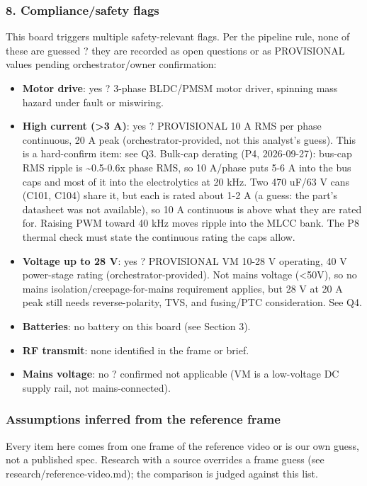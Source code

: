 \documentclass[11pt,a4paper]{article}
\begin{document}
\subsubsection*{8. Compliance/safety flags}
This board triggers multiple safety-relevant flags. Per the pipeline rule, none of these are guessed ? they are recorded as open questions or as PROVISIONAL values pending orchestrator/owner confirmation:

\begin{itemize}
\item \textbf{Motor drive}: yes ? 3-phase BLDC/PMSM motor driver, spinning mass
hazard under fault or miswiring.
\item \textbf{High current (\textgreater{}3 A)}: yes ? PROVISIONAL 10 A RMS per phase continuous,
20 A peak (orchestrator-provided, not this analyst's guess). This is a
hard-confirm item: see Q3.
Bulk-cap derating (P4, 2026-09-27): bus-cap RMS ripple is \textasciitilde{}0.5-0.6x phase
RMS, so 10 A/phase puts 5-6 A into the bus caps and most of it into the
electrolytics at 20 kHz. Two 470 uF/63 V cans (C101, C104) share it, but
each is rated about 1-2 A (a guess: the part's datasheet was not
available), so 10 A continuous is above what they are rated for. Raising
PWM toward 40 kHz moves ripple into the MLCC bank. The P8 thermal check
must state the continuous rating the caps allow.
\item \textbf{Voltage up to 28 V}: yes ? PROVISIONAL VM 10-28 V operating, 40 V
power-stage rating (orchestrator-provided). Not mains voltage (\textless{}50V), so
no mains isolation/creepage-for-mains requirement applies, but 28 V at
20 A peak still needs reverse-polarity, TVS, and fusing/PTC
consideration. See Q4.
\item \textbf{Batteries}: no battery on this board (see Section 3).
\item \textbf{RF transmit}: none identified in the frame or brief.
\item \textbf{Mains voltage}: no ? confirmed not applicable (VM is a low-voltage DC
supply rail, not mains-connected).
\end{itemize}
\subsubsection*{Assumptions inferred from the reference frame}
Every item here comes from one frame of the reference video or is our own guess, not a published spec. Research with a source overrides a frame guess (see research/reference-video.md); the comparison is judged against this list.
\end{document}
